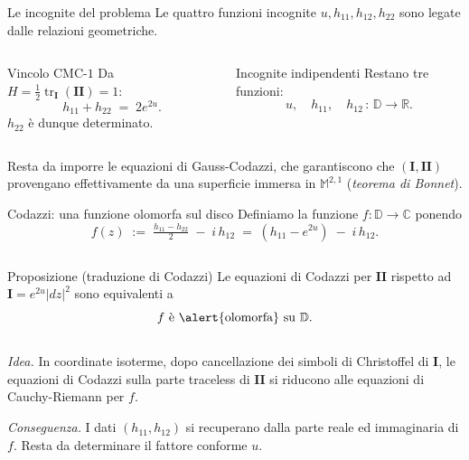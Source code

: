 \documentclass[aspectratio=169,11pt]{beamer}
\newcommand{\tr}{\operatorname{tr}}
\newcommand{\C}{\mathbb{C}}
\newcommand{\R}{\mathbb{R}}
\newcommand{\D}{\mathbb{D}}
\newcommand{\M}{\mathbb{M}^{2,1}}
\newcommand{\Iff}{\mathbf{I}}
\newcommand{\IIff}{\mathbf{II}}
\begin{document}
\begin{frame}[t]{Le incognite del problema}
  Le \alert{quattro funzioni incognite} $u,h_{11},h_{12},h_{22}$ sono
  legate dalle relazioni geometriche.

  \vspace{2mm}
  \begin{columns}[T,onlytextwidth]
    \begin{block}{Vincolo CMC-$1$}
      \centering
      Da $H=\tfrac12\tr_{\Iff}(\IIff)=1$:
      \[
        h_{11}+h_{22} \;=\; 2e^{2u}.
      \]
      $h_{22}$ è dunque determinato.
    \end{block}
    \begin{block}{Incognite indipendenti}
      \centering
      Restano \alert{tre} funzioni:
      \[
        u,\quad h_{11},\quad h_{12}\,:\,\D\to\R.
      \]
    \end{block}
  \end{columns}

  \vspace{3mm}
  Resta da imporre le equazioni di \alert{Gauss-Codazzi}, che
  garantiscono che $(\Iff,\IIff)$ provengano effettivamente da una
  superficie immersa in $\M$ (\emph{teorema di Bonnet}).
\end{frame}


\begin{frame}[t]{Codazzi: una funzione olomorfa sul disco}
  Definiamo la funzione $f:\D\to\C$ ponendo
  \[
    f(z) \;:=\; \tfrac{h_{11}-h_{22}}{2}\;-\;i\,h_{12}
        \;=\; (h_{11}-e^{2u})\;-\;i\,h_{12}.
  \]

  \vspace{1mm}
  \begin{columns}[T,onlytextwidth]
    \hfill
    \begin{block}{Proposizione (traduzione di Codazzi)}
      \centering
      Le equazioni di Codazzi per $\IIff$ rispetto ad $\Iff=e^{2u}|dz|^2$ sono
      equivalenti a
      \[
        f \text{ è \alert{olomorfa} su } \D.
      \]
    \end{block}
    \hfill
  \end{columns}

  \vspace{2mm}
  \emph{Idea.} In coordinate isoterme, dopo cancellazione dei
  simboli di Christoffel di $\Iff$, le equazioni di Codazzi sulla
  parte traceless di $\IIff$ si riducono alle equazioni di
  \alert{Cauchy-Riemann} per $f$.

  \vspace{2mm}
  \emph{Conseguenza.} I dati $(h_{11},h_{12})$ si recuperano dalla
  parte reale ed immaginaria di $f$. Resta da determinare il fattore
  conforme $u$.
\end{frame}
\end{document}
